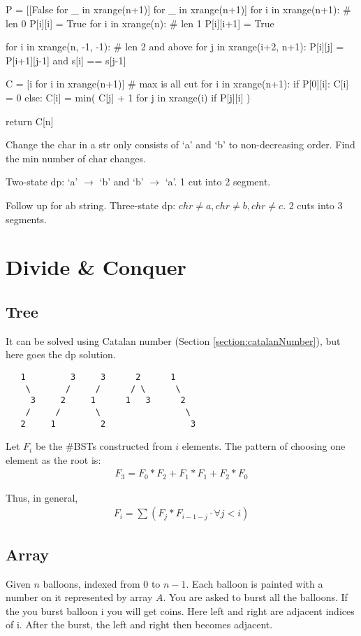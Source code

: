 {\begin{python}
  P = [[False for _ in xrange(n+1)] for _ in xrange(n+1)]
  for i in xrange(n+1):  # len 0
    P[i][i] = True
  for i in xrange(n):  # len 1
    P[i][i+1] = True

  for i in xrange(n, -1, -1):  # len 2 and above
    for j in xrange(i+2, n+1):
      P[i][j] = P[i+1][j-1] and s[i] == s[j-1]

  C = [i for i in xrange(n+1)]  # max is all cut
  for i in xrange(n+1):
    if P[0][i]:
      C[i] = 0
    else:
      C[i] = min(
          C[j] + 1
          for j in xrange(i)
          if P[j][i]
      )

  return C[n]
\end{python}
 Change the char in a str only consists of `a' and `b' to non-decreasing order. Find the min number of char changes. 

Two-state dp: `a' $\rightarrow$ `b' and  `b' $\rightarrow$ `a'. 1 cut into 2 segment.

 Follow up for ab string. Three-state dp: $chr \neq a, chr \neq b, chr \neq c$. 2 cuts into 3 segments.

\section{Divide \& Conquer}
\subsection{Tree}
 It can be solved using Catalan number (Section \ref{section:catalanNumber}), but here goes the dp solution. 
\begin{lstlisting}
   1         3     3      2      1
    \       /     /      / \      \
     3     2     1      1   3      2
    /     /       \                 \
   2     1         2                 3
\end{lstlisting}

Let $F_i$ be the \#BSTs constructed from $i$ elements. The pattern of choosing one element as the root is: 
\begin{align*}
F_3 = F_0*F_2 + F_1*F_1 + F_2*F_0
\end{align*}

Thus, in general, 
\begin{align*}
F_i = \sum(F_{j}*F_{i-1-j} \cdot \forall j< i)
\end{align*}

\subsection{Array}
 Given $n$ balloons, indexed from 0 to $n-1$. Each balloon is painted with a number on it represented by array $A$. You are asked to burst all the balloons. If the you burst balloon i you will get  coins. Here left and right are adjacent indices of i. After the burst, the left and right then becomes adjacent.

}
